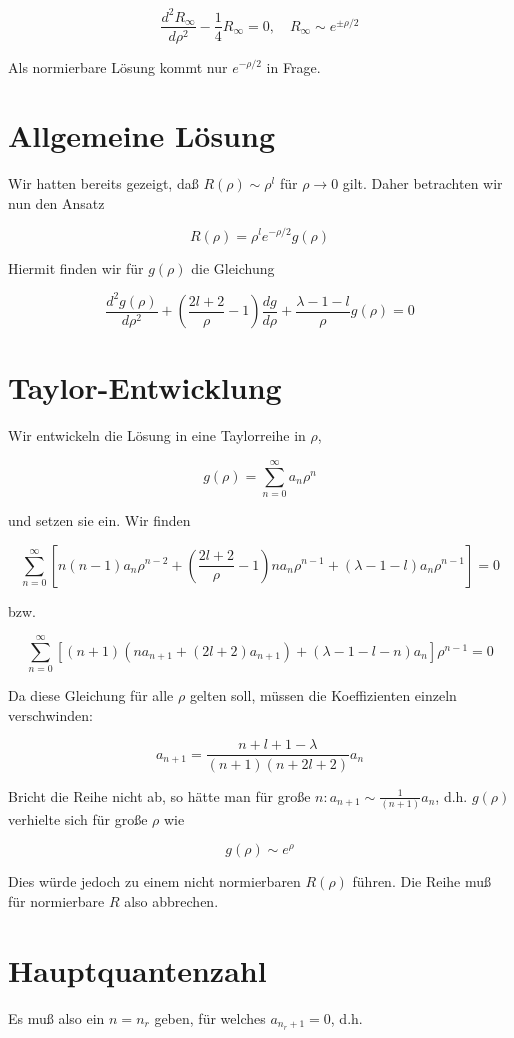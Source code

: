 \documentclass[10pt, letterpaper]{article}
\begin{document}
$$
\frac{d^{2} R_{\infty}}{d \rho^{2}}-\frac{1}{4} R_{\infty}=0, \quad R_{\infty} \sim e^{ \pm \rho / 2}
$$

Als normierbare Lösung kommt nur $e^{-\rho / 2}$ in Frage.

\section*{Allgemeine Lösung}
Wir hatten bereits gezeigt, daß $R(\rho) \sim \rho^{l}$ für $\rho \rightarrow 0$ gilt. Daher betrachten wir nun den Ansatz

$$
R(\rho)=\rho^{l} e^{-\rho / 2} g(\rho)
$$

Hiermit finden wir für $g(\rho)$ die Gleichung

$$
\frac{d^{2} g(\rho)}{d \rho^{2}}+\left(\frac{2 l+2}{\rho}-1\right) \frac{d g}{d \rho}+\frac{\lambda-1-l}{\rho} g(\rho)=0
$$

\section*{Taylor-Entwicklung}
Wir entwickeln die Lösung in eine Taylorreihe in $\rho$,

$$
g(\rho)=\sum_{n=0}^{\infty} a_{n} \rho^{n}
$$

und setzen sie ein. Wir finden

$$
\sum_{n=0}^{\infty}\left[n(n-1) a_{n} \rho^{n-2}+\left(\frac{2 l+2}{\rho}-1\right) n a_{n} \rho^{n-1}+(\lambda-1-l) a_{n} \rho^{n-1}\right]=0
$$

bzw.

$$
\sum_{n=0}^{\infty}\left[(n+1)\left(n a_{n+1}+(2 l+2) a_{n+1}\right)+(\lambda-1-l-n) a_{n}\right] \rho^{n-1}=0
$$

Da diese Gleichung für alle $\rho$ gelten soll, müssen die Koeffizienten einzeln verschwinden:

$$
a_{n+1}=\frac{n+l+1-\lambda}{(n+1)(n+2 l+2)} a_{n}
$$

Bricht die Reihe nicht ab, so hätte man für große $n: a_{n+1} \sim \frac{1}{(n+1)} a_{n}$, d.h. $g(\rho)$ verhielte sich für große $\rho$ wie

$$
g(\rho) \sim e^{\rho}
$$

Dies würde jedoch zu einem nicht normierbaren $R(\rho)$ führen. Die Reihe muß für normierbare $R$ also abbrechen.

\section*{Hauptquantenzahl}
Es muß also ein $n=n_{r}$ geben, für welches $a_{n_{r}+1}=0$, d.h.
\end{document}
